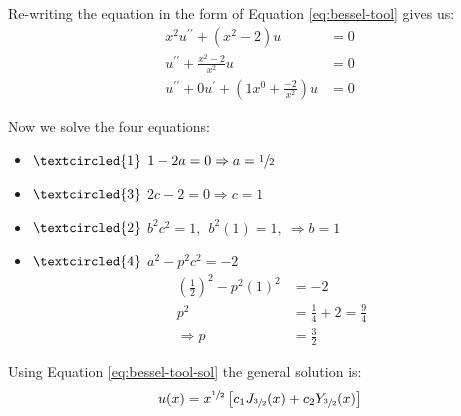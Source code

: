 Re-writing the equation in the form of Equation \ref{eq:bessel-tool} gives us:
\begin{align*}
x^2 u^{\prime \prime} + \left(x^2 - 2\right)u &= 0 \\
u^{\prime \prime} + \frac{x^2-2}{x^2}u &= 0 \\
u^{\prime \prime} + 0u^{\prime} + \left(1x^0 + \frac{-2}{x^2} \right)u &= 0
\end{align*}

Now we solve the four equations:
\begin{itemize}
\item $\textcircled{1}$  $1-2a = 0 \Rightarrow a = \sfrac{1}{2}$
\item $\textcircled{3}$ $2c-2=0 \Rightarrow c = 1$
\item $\textcircled{2}$ $b^2c^2=1, \ \ b^2(1) = 1, \ \Rightarrow b=1$
\item $\textcircled{4}$ $a^2 - p^2c^2=-2$ 
\begin{align*}
\left(\frac{1}{2} \right)^2 - p^2(1)^2 &=-2 \\
p^2 &= \frac{1}{4} + 2 = \frac{9}{4} \\
\Rightarrow p &= \frac{3}{2}
\end{align*}
\end{itemize}
Using Equation \ref{eq:bessel-tool-sol} the general solution is:
\begin{equation*}
u(x) = x^{\sfrac{1}{2}}\left[c_1 J_{\sfrac{3}{2}}(x) + c_2 Y_{\sfrac{3}{2}}(x) \right]
\end{equation*}


